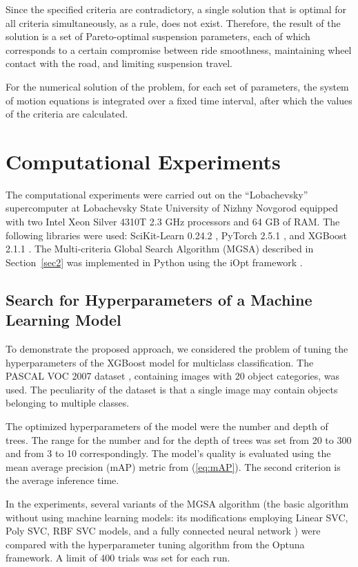 \documentclass[a4paper]{llncs}
\begin{document}
Since the specified criteria are contradictory, a single solution that is optimal for all criteria simultaneously, as a rule, does not exist. Therefore, the result of the solution is a set of Pareto-optimal suspension parameters, each of which corresponds to a certain compromise between ride smoothness, maintaining wheel contact with the road, and limiting suspension travel.

For the numerical solution of the problem, for each set of parameters, the system of motion equations is integrated over a fixed time interval, after which the values of the criteria are calculated.

\section{Computational Experiments}
\label{sec4}

The computational experiments were carried out on the ``Lobachevsky'' supercomputer at Lobachevsky State University of Nizhny Novgorod equipped with two Intel Xeon Silver 4310T 2.3 GHz processors and 64 GB of RAM. The following libraries were used: SciKit-Learn 0.24.2 \cite{scikit-learn}, PyTorch 2.5.1 \cite{PyTorch}, and XGBoost 2.1.1 \cite{Chen2016XGBoost}. The Multi-criteria Global Search Algorithm (MGSA) described in Section~\ref{sec2} was implemented in Python using the iOpt framework \cite{ioptmco}.

\subsection{Search for Hyperparameters of a Machine Learning Model}
\label{subsec41}

To demonstrate the proposed approach, we considered the problem of tuning the hyperparameters of the XGBoost model for multiclass classification. The PASCAL VOC 2007 dataset \cite{Everingham2010VOC}, containing images with 20 object categories, was used. The peculiarity of the dataset is that a single image may contain objects belonging to multiple classes.

The optimized hyperparameters of the model were the number and depth of trees. The range for the number and for the depth of trees was set from 20 to 300 and from 3 to 10 correspondingly. The model's quality is evaluated using the mean average precision (mAP) metric from (\ref{eq:mAP}). The second criterion is the average inference time.

In the experiments, several variants of the MGSA algorithm (the basic algorithm without using machine learning models: its modifications employing Linear SVC, Poly SVC, RBF SVC models, and a fully connected neural network \cite{Konnov2025}) were compared with the hyperparameter tuning algorithm from the Optuna framework. A limit of 400 trials was set for each run.
\end{document}
